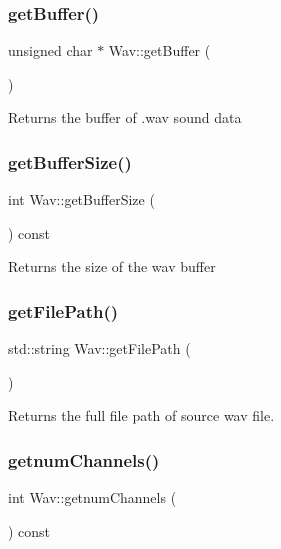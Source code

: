 \subsubsection{\texorpdfstring{get\+Buffer()}{getBuffer()}}
{\footnotesize\ttfamily unsigned char $\ast$ Wav\+::get\+Buffer (\begin{DoxyParamCaption}{ }\end{DoxyParamCaption})}

Returns the buffer of .wav sound data \mbox{\label{classWav_a71fdfa1d9f5e7c1b86f07bbff4249dca}} 
\subsubsection{\texorpdfstring{get\+Buffer\+Size()}{getBufferSize()}}
{\footnotesize\ttfamily int Wav\+::get\+Buffer\+Size (\begin{DoxyParamCaption}{ }\end{DoxyParamCaption}) const}

Returns the size of the wav buffer \mbox{\label{classWav_a2a0cddb7e39fa964ef46737fcfcb9372}} 
\subsubsection{\texorpdfstring{get\+File\+Path()}{getFilePath()}}
{\footnotesize\ttfamily std\+::string Wav\+::get\+File\+Path (\begin{DoxyParamCaption}{ }\end{DoxyParamCaption})}

Returns the full file path of source wav file. \mbox{\label{classWav_a3be0de234388ed90f2039bf193214c02}} 
\subsubsection{\texorpdfstring{getnum\+Channels()}{getnumChannels()}}
{\footnotesize\ttfamily int Wav\+::getnum\+Channels (\begin{DoxyParamCaption}{ }\end{DoxyParamCaption}) const}

